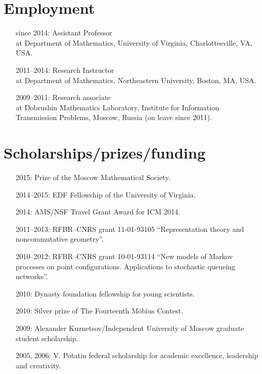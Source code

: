 \documentclass[letterpaper,11pt]{article}
\begin{document}
\section*{Employment}

\begin{itemize}
\item[since 2014:]
Assistant Professor\\
at Department of Mathematics, 
University of Virginia, 
Charlottesville, VA, USA.

\item[2011--2014:]
Research Instructor\\ at
Department of Mathematics,
Northeastern University, Boston, MA, USA.

\item[2009--2011:]
Research associate\\
at
Dobrushin Mathematics Laboratory,
Institute for Information Transmission Problems, Moscow, Russia (on leave since 2011).
\end{itemize}

\section*{Scholarships/prizes/funding}
\begin{itemize}
	\item[2015:] Prize of the Moscow Mathematical Society.
	\item[2014--2015:] EDF Fellowship of the University of Virginia. 
	\item[2014:] AMS/NSF Travel Grant Award for ICM 2014.
	\item[2011--2013:] RFBR--CNRS grant 11-01-93105 ``Representation theory and noncommutative geometry''.
	\item[2010--2012:] RFBR--CNRS grant 10-01-93114 ``New models of Markov processes on point configurations. Applications to stochastic queueing networks''.
	\item[2010:] Dynasty foundation fellowship for young scientists.
	\item[2010:] Silver prize of The Fourteenth M\"obius Contest.
	\item[2009:] Alexander Kuznetsov/Independent University of Moscow graduate student scholarship.
	\item[2005, 2006:] V. Potatin federal scholarship for academic excellence, leadership and creativity.
\end{itemize}
\end{document}
